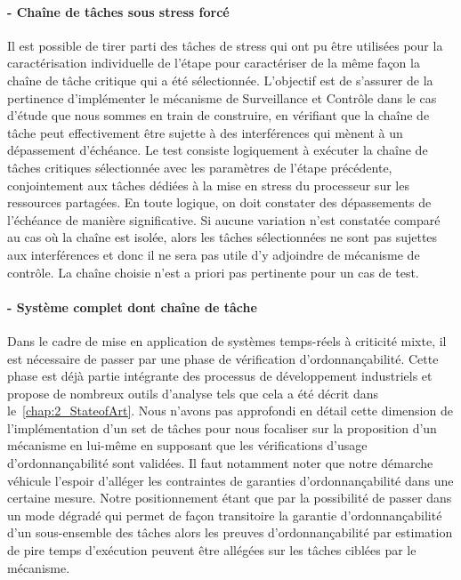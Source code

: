 \documentclass[french, a4paper, 11pt, twoside, pdftex]{StyleThese}
\begin{document}
		\paragraph{ - Chaîne de tâches sous stress forcé}
		Il est possible de tirer parti des tâches de stress qui ont pu être utilisées pour la caractérisation individuelle de l'étape  pour caractériser de la même façon la chaîne de tâche critique qui a été sélectionnée. L'objectif est de s'assurer de la pertinence d'implémenter le mécanisme de Surveillance et Contrôle dans le cas d'étude que nous sommes en train de construire, en vérifiant que la chaîne de tâche peut effectivement être sujette à des interférences qui mènent à un dépassement d'échéance. 
		Le test consiste logiquement à exécuter la chaîne de tâches critiques sélectionnée avec les paramètres de l'étape précédente, conjointement aux tâches dédiées à la mise en stress du processeur sur les ressources partagées. En toute logique, on doit constater des dépassements de l'échéance de manière significative. Si aucune variation n'est constatée comparé au cas où la chaîne est isolée, alors les tâches sélectionnées ne sont pas sujettes aux interférences et donc il ne sera pas utile d'y adjoindre de mécanisme de contrôle. La chaîne choisie n'est a priori pas pertinente pour un cas de test.

		\paragraph{ - Système complet dont chaîne de tâche}
		Dans le cadre de mise en application de systèmes temps-réels à criticité mixte, il est nécessaire de passer par une phase de vérification d'ordonnançabilité. Cette phase est déjà partie intégrante des processus de développement industriels et propose de nombreux outils d'analyse tels que cela a été décrit dans le~\autoref{chap:2_StateofArt}. Nous n'avons pas approfondi en détail cette dimension de l'implémentation d'un set de tâches pour nous focaliser sur la proposition d'un mécanisme en lui-même en supposant que les vérifications d'usage d'ordonnançabilité sont validées. Il faut notamment noter que notre démarche véhicule l'espoir d'alléger les contraintes de garanties d'ordonnançabilité dans une certaine mesure. Notre positionnement étant que par la possibilité de passer dans un mode dégradé qui permet de façon transitoire la garantie d'ordonnançabilité d'un sous-ensemble des tâches alors les preuves d'ordonnançabilité par estimation de pire temps d'exécution peuvent être allégées sur les tâches ciblées par le mécanisme.
		
\end{document}
